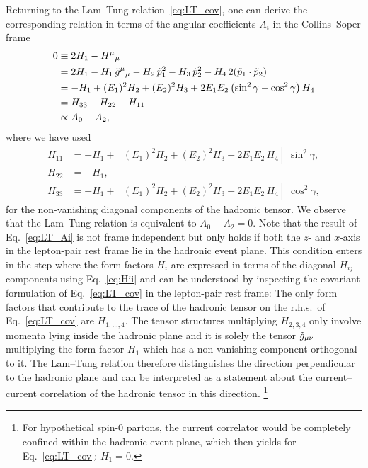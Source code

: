 Returning to the Lam--Tung relation~\eqref{eq:LT_cov}, one can derive the corresponding relation in terms of the angular coefficients $A_i$ in the Collins--Soper frame
\begin{align}
  0 &\equiv
  2 H_1 - H^{\mu}{}_{\mu}  \nonumber \\
  &= 2 H_1 - H_1\, \tilde{g}^{\mu}{}_{\mu} - H_2\, \tilde{p}_1^2 - H_3\, \tilde{p}_2^2 -H_4\, 2 (\tilde{p}_1\cdot\tilde{p}_2)  \nonumber \\
  &= - H_1 +(E_1)^2 H_2 + (E_2)^2 H_3 + 2 E_1 E_2 \left( \sin^2\gamma - \cos^2\gamma \right) H_4  \nonumber \\
  &= H_{33} - H_{22} + H_{11}  \nonumber \\
  &\propto A_0 - A_2  ,
  \label{eq:LT_Ai}
\end{align}
where we have used
\begin{align}
  H_{11} &= -H_1 + \left[ (E_1)^2 H_2 + (E_2)^2 H_3 + 2 E_1 E_2 \,H_4 \right] \; \sin^2\gamma , \nonumber \\
  H_{22} &= -H_1 , \nonumber \\
  H_{33} &= -H_1 + \left[ (E_1)^2 H_2 + (E_2)^2 H_3 - 2 E_1 E_2 \,H_4 \right] \; \cos^2\gamma , 
  \label{eq:Hii}
\end{align}
for the non-vanishing diagonal components of the hadronic tensor.
We observe that the Lam--Tung relation is equivalent to $A_0 - A_2 = 0$. 
Note that the result of Eq.~\eqref{eq:LT_Ai} is not frame independent but only holds if both the $z$- and $x$-axis 
in the lepton-pair rest frame lie in the hadronic event plane.
This condition enters in the step where the form factors $H_i$ are expressed in terms of the diagonal $H_{ij}$ components using Eq.~\eqref{eq:Hii} and can be understood by inspecting the covariant formulation of Eq.~\eqref{eq:LT_cov} in the lepton-pair rest frame:
The only form factors that contribute to the trace of the hadronic tensor on the r.h.s.\ of Eq.~\eqref{eq:LT_cov} are $H_{1,\ldots,4}$.
The tensor structures multiplying $H_{2,3,4}$ only involve momenta lying inside the hadronic plane and it is solely the tensor $\tilde{g}_{\mu\nu}$ multiplying the form factor $H_1$ which has a non-vanishing component orthogonal to it.
The Lam--Tung relation therefore distinguishes the direction perpendicular to the hadronic plane and can be interpreted as a statement about the current--current correlation of the hadronic tensor in this direction.%
\footnote{For hypothetical spin-$0$ partons, the current correlator would be completely confined within the hadronic event plane, which then yields for Eq.~\eqref{eq:LT_cov}: $H_1=0$.}

